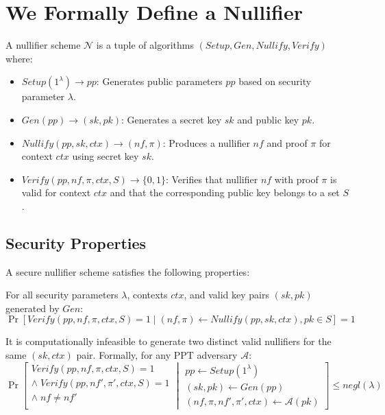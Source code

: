 \section{We Formally Define a Nullifier}

\begin{definition}
A nullifier scheme $\mathcal{N}$ is a tuple of algorithms $(Setup, Gen, Nullify, Verify)$ where:

\begin{itemize}
    \item $Setup(1^\lambda) \rightarrow pp$: Generates public parameters $pp$ based on security parameter $\lambda$.
    
    \item $Gen(pp) \rightarrow (sk, pk)$: Generates a secret key $sk$ and public key $pk$.
    
    \item $Nullify(pp, sk, ctx) \rightarrow (nf, \pi)$: Produces a nullifier $nf$ and proof $\pi$ for context $ctx$ using secret key $sk$.
    
    \item $Verify(pp, nf, \pi, ctx, S) \rightarrow \{0,1\}$: Verifies that nullifier $nf$ with proof $\pi$ is valid for context $ctx$ and that the corresponding public key belongs to a set $S$.
\end{itemize}
\end{definition}

\subsection{Security Properties}

A secure nullifier scheme satisfies the following properties:

\begin{property}[Correctness]
For all security parameters $\lambda$, contexts $ctx$, and valid key pairs $(sk, pk)$ generated by $Gen$:
$$\Pr[Verify(pp, nf, \pi, ctx, S) = 1 \mid (nf, \pi) \leftarrow Nullify(pp, sk, ctx), pk \in S] = 1$$
\end{property}

\begin{property}[Uniqueness]
It is computationally infeasible to generate two distinct valid nullifiers for the same $(sk, ctx)$ pair. Formally, for any PPT adversary $\mathcal{A}$:
$$\Pr\left[\begin{array}{c}
Verify(pp, nf, \pi, ctx, S) = 1 \\
\land\; Verify(pp, nf', \pi', ctx, S) = 1 \\
\land\; nf \neq nf' \\
\end{array}
\middle|
\begin{array}{c}
pp \leftarrow Setup(1^\lambda) \\
(sk, pk) \leftarrow Gen(pp) \\
(nf, \pi, nf', \pi', ctx) \leftarrow \mathcal{A}(pk)
\end{array}
\right] \leq negl(\lambda)$$
\end{property}

